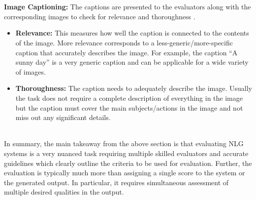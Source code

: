 ~\\\\
\textbf{Image Captioning:} The captions are presented to the evaluators along with the corresponding images to check for relevance and thoroughness .
\begin{itemize}
    \item \textbf{Relevance:} This measures how well the caption is connected to the contents of the image. More relevance corresponds to a less-generic/more-specific caption that accurately describes the image. For example, the caption ``A sunny day'' is a very generic caption and can be applicable for a wide variety of images.
    \item \textbf{Thoroughness:} The caption needs to adequately describe the image. Usually the task does not require a complete description of everything in the image but the caption must cover the main subjects/actions in the image and not miss out any significant details.
\end{itemize}
~\\
In summary, the main takeaway from the above section is that evaluating NLG systems is a very nuanced task requiring multiple skilled evaluators and accurate guidelines which clearly outline the criteria to be used for evaluation. Further, the evaluation is typically much more than assigning a single score to the system or the generated output. In particular, it requires simultaneous assessment of multiple desired qualities in the output.

